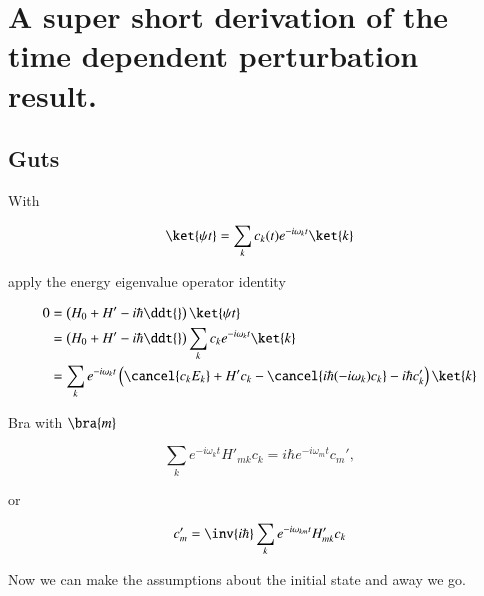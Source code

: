 %
%

\chapter{A super short derivation of the time dependent perturbation result.}
\label{chap:shortTimeDepPertubation}
{}
\date{Dec 8, 2011}

\beginArtNoToc

\section{Guts}

With

\begin{equation}\label{eqn:shortTimeDepPertubation:10}
\ket{\psi{t}} = \sum_k c_k(t) e^{-i\omega_k t} \ket{k}
\end{equation}

apply the energy eigenvalue operator identity

\begin{align*}
0
&=
\left( H_0 + H' - i\hbar \ddt{} \right)
\ket{\psi{t}} \\
&=
\left( H_0 + H' - i\hbar \ddt{} \right)
\sum_k c_k e^{-i\omega_k t} \ket{k} \\
&=
\sum_k e^{-i\omega_k t} 
\left(
\cancel{c_k E_k} + H' c_k - \cancel{i\hbar (-i \omega_k) c_k} -i\hbar c_k'
\right)
\ket{k}
\end{align*}

Bra with $\bra{m}$

\begin{equation}\label{eqn:shortTimeDepPertubation:30}
\sum_k e^{-i\omega_k t} 
H'_{mk} c_k 
=
i\hbar
e^{-i\omega_m t} 
c_m',
\end{equation}

or

\begin{equation}\label{eqn:shortTimeDepPertubation:50}
c_m'
=
\inv{i\hbar}
\sum_k e^{-i\omega_{km} t} 
H'_{mk} c_k 
\end{equation}

Now we can make the assumptions about the initial state and away we go.

\EndNoBibArticle
